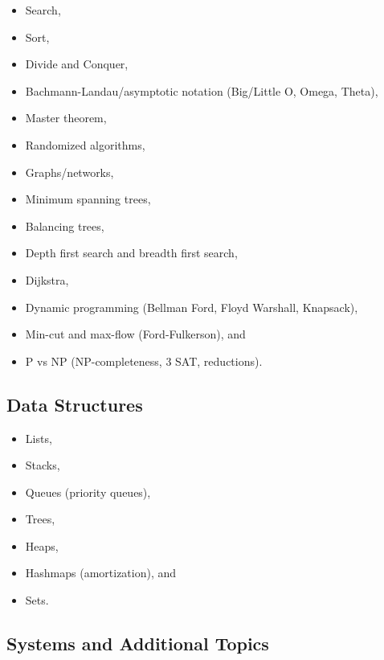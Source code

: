 \begin{itemize}
\tightlist
\item
  Search,
\item
  Sort,
\item
  Divide and Conquer,
\item
  Bachmann-Landau/asymptotic notation (Big/Little O, Omega, Theta),
\item
  Master theorem,
\item
  Randomized algorithms,
\item
  Graphs/networks,
\item
  Minimum spanning trees,
\item
  Balancing trees,
\item
  Depth first search and breadth first search,
\item
  Dijkstra,
\item
  Dynamic programming (Bellman Ford, Floyd Warshall, Knapsack),
\item
  Min-cut and max-flow (Ford-Fulkerson), and
\item
  P vs NP (NP-completeness, 3 SAT, reductions).
\end{itemize}

\hypertarget{data-structures}{%
\subsection{Data Structures}\label{data-structures}}

\begin{itemize}
\tightlist
\item
  Lists,
\item
  Stacks,
\item
  Queues (priority queues),
\item
  Trees,
\item
  Heaps,
\item
  Hashmaps (amortization), and
\item
  Sets.
\end{itemize}

\hypertarget{systems-and-additional-topics}{%
\subsection{Systems and Additional
Topics}\label{systems-and-additional-topics}}

